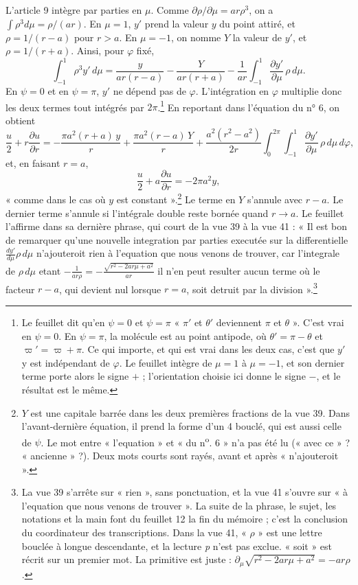 \documentclass[11pt,a4paper]{article}
\begin{document}
L'article 9 intègre par parties en \(\mu\). Comme \(\partial\rho/\partial\mu
=ar\rho^3\), on a \(\int\rho^3d\mu=\rho/(ar)\). En \(\mu=1\), \(y'\) prend la
valeur \(y\) du point attiré, et \(\rho=1/(r-a)\) pour \(r>a\). En \(\mu=-1\),
on nomme \(Y\) la valeur de \(y'\), et \(\rho=1/(r+a)\). Ainsi, pour \(\varphi\)
fixé,
\[
\int_{-1}^{1}\rho^3y'\,d\mu=\frac{y}{ar(r-a)}-\frac{Y}{ar(r+a)}-\frac1{ar}\int_{-1}^{1}\frac{\partial y'}{\partial\mu}\,\rho\,d\mu .
\]
En \(\psi=0\) et en \(\psi=\pi\), \(y'\) ne dépend pas de \(\varphi\).
L'intégration en \(\varphi\) multiplie donc les deux termes tout intégrés par
\(2\pi\).\footnote{Le feuillet dit qu'en \(\psi=0\) et \(\psi=\pi\) « \(\pi'\)
et \(\theta'\) deviennent \(\pi\) et \(\theta\) ». C'est vrai en \(\psi=0\).
En \(\psi=\pi\), la molécule est au point antipode, où
\(\theta'=\pi-\theta\) et \(\varpi'=\varpi+\pi\). Ce qui importe, et qui est
vrai dans les deux cas, c'est que \(y'\) y est indépendant de \(\varphi\). Le
feuillet intègre de \(\mu=1\) à \(\mu=-1\), et son dernier terme porte alors le
signe \(+\) ; l'orientation choisie ici donne le signe \(-\), et le résultat
est le même.} En reportant dans l'équation du n° 6, on obtient
\[
\frac u2+r\frac{\partial u}{\partial r}
=-\frac{\pi a^2(r+a)\,y}{r}+\frac{\pi a^2(r-a)\,Y}{r}
+\frac{a^2(r^2-a^2)}{2r}\int_0^{2\pi}\!\!\int_{-1}^{1}\frac{\partial y'}{\partial\mu}\,\rho\,d\mu\,d\varphi ,
\]
et, en faisant \(r=a\),
\[
\frac u2+a\frac{\partial u}{\partial r}=-2\pi a^2y,
\]
« comme dans le cas où \(y\) est constant ».\footnote{\(Y\) est une capitale
barrée dans les deux premières fractions de la vue 39. Dans l'avant-dernière
équation, il prend la forme d'un 4 bouclé, qui est aussi celle de \(\psi\). Le
mot entre « l'equation » et « du n\textsuperscript{o}. 6 » n'a pas été lu
(« avec ce » ? « ancienne » ?). Deux mots courts sont rayés, avant et après
« n'ajouteroit ».} Le terme en \(Y\) s'annule avec \(r-a\). Le dernier terme
s'annule si l'intégrale double reste bornée quand \(r\to a\). Le feuillet
l'affirme dans sa dernière phrase, qui court de la vue 39 à la vue 41 : « Il
est bon de remarquer qu'une nouvelle integration par parties executée sur la
differentielle \(\frac{dy'}{d\mu}\rho\,d\mu\) n'ajouteroit rien à l'equation
que nous venons de trouver, car l'integrale de \(\rho\,d\mu\) etant
\(-\frac{1}{ar\rho}=-\frac{\sqrt{r^2-2ar\mu+a^2}}{ar}\) il n'en peut resulter
aucun terme où le facteur \(r-a\), qui devient nul lorsque \(r=a\), soit
detruit par la division ».\footnote{La vue 39 s'arrête sur « rien », sans
ponctuation, et la vue 41 s'ouvre sur « à l'equation que nous venons de
trouver ». La suite de la phrase, le sujet, les notations et la main font du
feuillet 12 la fin du mémoire ; c'est la conclusion du coordinateur des
transcriptions. Dans la vue 41, « \(\rho\) » est une lettre bouclée à longue
descendante, et la lecture \emph{p} n'est pas exclue. « soit » est récrit sur
un premier mot. La primitive est juste :
\(\partial_\mu\sqrt{r^2-2ar\mu+a^2}=-ar\rho\).}
\end{document}
